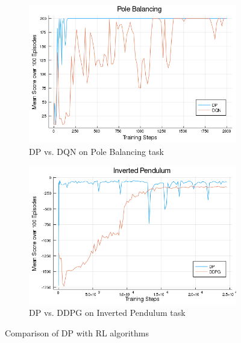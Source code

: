 \documentclass{juliacon}
\begin{document}
\begin{figure}[!htb]
    \centering
    \begin{subfigure}[b]{0.4\textwidth}
        \centering
        \includegraphics[width=\textwidth]{images/Agents/dp_vs_dqn.png}
        \caption{DP vs. DQN\cite{Mnih2015HumanlevelCT} on Pole Balancing task}
        \label{fig:score_plot_cartpole}
    \end{subfigure}
    
    \centering
    \begin{subfigure}[b]{0.4\textwidth}
        \centering
        \includegraphics[width=\textwidth]{images/Agents/dp_vs_ddpg.png}
        \caption{DP vs. DDPG\cite{Lillicrap2015ContinuousCW} on Inverted Pendulum task}
        \label{fig:score_plot_pendulum}
    \end{subfigure}
    \caption{Comparison of DP with RL algorithms}
\end{figure}
\end{document}
